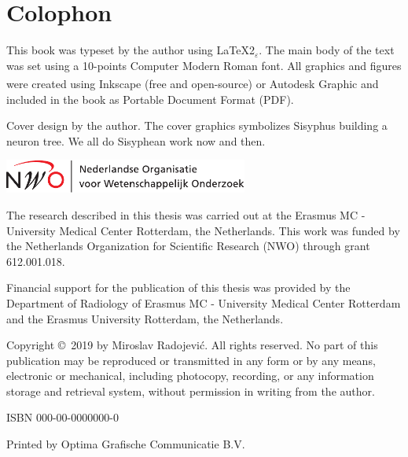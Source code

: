 %
%

\newpage
\setlength{\parindent}{0pt}
\thispagestyle{empty}

\section*{Colophon}

\bigskip
This book was typeset by the author using \LaTeX{}2{\LARGE $_{\varepsilon}$}. The main body of the text was set using a 10-points Computer Modern Roman font. All graphics and figures were created using Inkscape (free and open-source) or Autodesk \textsuperscript{\textregistered}Graphic and included in the book as Portable Document Format (PDF). %

\bigskip
Cover design by the author. The cover graphics symbolizes Sisyphus building a neuron tree. We all do Sisyphean work now and then.

\vfill
\includegraphics[height=3em]{./logos/nwo-nl}
\smallskip

The research described in this thesis was carried out at the Erasmus MC - University Medical Center Rotterdam, the Netherlands. This work was funded by the Netherlands Organization for Scientific Research (NWO) through grant 612.001.018.
\bigskip

Financial support for the publication of this thesis was provided by the Department of Radiology of Erasmus MC - University Medical Center Rotterdam and the Erasmus University Rotterdam, the Netherlands.

\bigskip

Copyright \copyright\ 2019 by Miroslav Radojevi\'{c}. All rights reserved. No part of this publication may be reproduced or transmitted in any form or by any means, electronic or mechanical, including photocopy, recording, or any information storage and retrieval system, without permission in writing from the author.

\bigskip
ISBN 000-00-0000000-0

\smallskip
Printed by Optima Grafische Communicatie B.V.
\setlength{\parindent}{\myindent}

